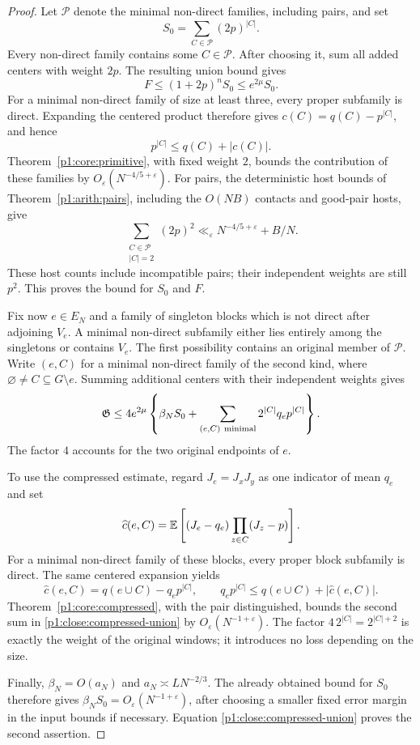 \begin{proof}
Let $\mathcal P$ denote the minimal non-direct families,
including pairs, and set
\[
 S_0=\sum_{C\in\mathcal P}(2p)^{|C|}.
\]
Every non-direct family contains some $C\in\mathcal P$.
After choosing it, sum all added centers with weight $2p$.
The resulting union bound gives
\begin{equation}
 F\le(1+2p)^n S_0\le e^{2\mu}S_0.
 \label{p1:close:ordinary-union}
\end{equation}
For a minimal non-direct family of size at least three,
every proper subfamily is direct.  Expanding the centered
product therefore gives
$c(C)=q(C)-p^{|C|}$, and hence
\[
 p^{|C|}\le q(C)+|c(C)|.
\]
Theorem~\ref{p1:core:primitive}, with fixed weight $2$, bounds
the contribution of these families by
$O_\varepsilon(N^{-4/5+\varepsilon})$.
For pairs, the deterministic host bounds of
Theorem~\ref{p1:arith:pairs}, including the $O(NB)$ contacts
and good-pair hosts, give
\[
 \sum_{\substack{C\in\mathcal P\\|C|=2}}(2p)^2
    \ll_\varepsilon N^{-4/5+\varepsilon}+B/N.
\]
These host counts include incompatible pairs; their independent
weights are still $p^2$.  This proves the bound for $S_0$ and $F$.

Fix now $e\in E_N$ and a family of singleton blocks which is not
direct after adjoining $V_e$.  A minimal non-direct subfamily
either lies entirely among the singletons or contains $V_e$.
The first possibility contains an original member of $\mathcal P$.
Write $(e,C)$ for a minimal non-direct family of the second
kind, where $\varnothing\ne C\subseteq G\setminus e$.
Summing additional centers with their independent weights gives
\begin{equation}
 \mathfrak G
 \le4e^{2\mu}\left\{
       \beta_N S_0+
       \sum_{(e,C)\ {\rm minimal}}
                 2^{|C|}q_ep^{|C|}
             \right\}.
 \label{p1:close:compressed-union}
\end{equation}
The factor $4$ accounts for the two original endpoints of $e$.

To use the compressed estimate, regard
$J_e=J_xJ_y$ as one indicator of mean $q_e$ and set
\[
 \widehat c(e,C)
   =\mathbb E\left[(J_e-q_e)\prod_{z\in C}(J_z-p)\right].
\]
For a minimal non-direct family of these blocks, every proper
block subfamily is direct.  The same centered expansion yields
\[
 \widehat c(e,C)=q(e\cup C)-q_ep^{|C|},
 \qquad
 q_ep^{|C|}\le q(e\cup C)+|\widehat c(e,C)|.
\]
Theorem~\ref{p1:core:compressed}, with the pair distinguished,
bounds the second sum in \eqref{p1:close:compressed-union}
by $O_\varepsilon(N^{-1+\varepsilon})$.
The factor $4\,2^{|C|}=2^{|C|+2}$ is exactly the weight of
the original windows; it introduces no loss depending on
the size.

Finally, $\beta_N=O(a_N)$ and
$a_N\asymp LN^{-2/3}$.  The already obtained bound for $S_0$
therefore gives $\beta_NS_0=O_\varepsilon(N^{-1+\varepsilon})$,
after choosing a smaller fixed error margin in the input bounds
if necessary.  Equation \eqref{p1:close:compressed-union}
proves the second assertion.
\end{proof}

